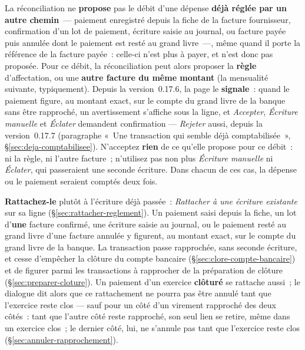 \documentclass[a4paper,11pt,oneside]{article}
\begin{document}
\begin{keshwarning}[title=\faExclamationTriangle\ Dépense déjà réglée par un autre chemin]
La réconciliation ne \textbf{propose} pas le débit d'une dépense \textbf{déjà réglée par un autre
chemin}~--- paiement enregistré depuis la fiche de la facture fournisseur, confirmation d'un lot de
paiement, écriture saisie au journal, ou facture payée puis annulée dont le paiement est resté au
grand livre~---, même quand il porte la référence de la facture payée~: celle-ci n'est plus
à payer, et n'est donc pas proposée. Pour ce débit, la réconciliation peut alors proposer la
\textbf{règle} d'affectation, ou une \textbf{autre facture du même montant} (la mensualité
suivante, typiquement). Depuis la version~0.17.6, la page le \textbf{signale}~: quand le
paiement figure, au montant exact, sur le compte du grand livre de la banque sans être rapproché,
un avertissement s'affiche sous la ligne, et \emph{Accepter}, \emph{Écriture manuelle} et
\emph{Éclater} demandent confirmation --- \emph{Rejeter} aussi, depuis la version~0.17.7
(paragraphe «~Une transaction qui semble déjà comptabilisée~», \S\ref{sec:deja-comptabilisee}). N'acceptez \textbf{rien} de ce qu'elle
propose pour ce débit~: ni la règle, ni l'autre facture~; n'utilisez pas non plus \emph{Écriture
manuelle} ni \emph{Éclater}, qui passeraient une seconde écriture. Dans chacun de ces cas, la
dépense ou le paiement seraient comptés deux fois.

\textbf{Rattachez-le} plutôt à l'écriture déjà passée~: \emph{Rattacher à une écriture
existante} sur sa ligne (\S\ref{sec:rattacher-reglement}). Un paiement saisi depuis la fiche, un
lot d'\textbf{une} facture confirmé, une écriture saisie au journal, ou le paiement resté au grand
livre d'une facture annulée y figurent, au montant exact, sur le compte du grand livre de la banque.
La transaction passe rapprochée, sans seconde écriture, et cesse d'empêcher la clôture du compte
bancaire (\S\ref{sec:clore-compte-bancaire}) et de figurer parmi les transactions à rapprocher de
la préparation de clôture (\S\ref{sec:preparer-cloture}). Un paiement d'un exercice
\textbf{clôturé} se rattache aussi~; le dialogue dit alors que ce rattachement ne pourra pas être
annulé tant que l'exercice reste clos --- sauf pour un côté d'un virement rapproché des deux côtés~:
tant que l'autre côté reste rapproché, son seul lien se retire, même dans un exercice clos~; le
dernier côté, lui, ne s'annule pas tant que l'exercice reste clos (\S\ref{sec:annuler-rapprochement}).


\end{keshwarning}
\end{document}
